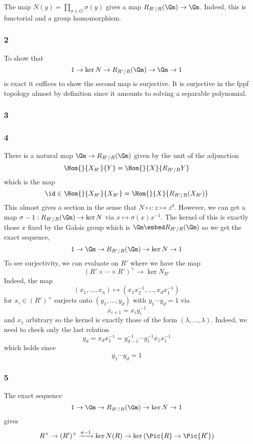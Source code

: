 \documentclass{article}
\begin{document}
The map $N(y) = \prod_{\sigma \in G} \sigma(y)$ gives a map $R_{R'/R}(\Gm) \to \Gm$. Indeed, this is functorial and a group homomorphism. 

\subsubsection{2}

To show that
\[ 1 \to \ker{N} \to R_{R'/R}(\Gm) \to \Gm \to 1 \]
is exact it suffices to show the second map is surjective. It is surjective in the fppf topology almost by definition since it amounts to solving a separable polynomial.

\subsubsection{3}

\subsubsection{4}

There is a natural map $\Gm \to R_{R'/R}(\Gm)$ given by the unit of the adjunction
\[ \Hom{}{X_{R'}}{Y} = \Hom{}{X}{R_{R'/R} Y} \]
which is the map
\[ \id \in \Hom{}{X_{R'}}{X_{R'}} = \Hom{}{X}{R_{R'/R}(X_{R'})} \]
This almost gives a section in the sense that $N \circ \iota : z \mapsto z^d$. However, we can get a map $\sigma - 1 : R_{R'/R}(\Gm) \to \ker{N}$ via $x \mapsto \sigma(x) x^{-1}$. The kernel of this is exactly those $x$ fixed by the Galois group which is $\Gm \embed R_{R'/R}(\Gm)$ so we get the exact sequence,
\[ 1 \to \Gm \to R_{R'/R}(\Gm) \to \ker{N} \to 1 \]
To see surjectivity, we can evaluate on $R'$ where we have the map
\[ (R' \times \cdots \times R')^\times \to \ker{N_{R'}} \]
Indeed, the map 
\[ (x_1, \dots, x_n) \mapsto (x_1 x_2^{-1}, \dots, x_d x_1^{-1}) \]
for $x_i \in (R')^\times$ surjects onto $(y_1, \dots, y_d)$ with $y_1 \cdots y_d = 1$ via
\[ x_{i+1} = x_i y_i^{-1} \]
and $x_1$ arbitrary so the kernel is exactly those of the form $(\lambda, \dots, \lambda)$. Indeed, we need to check only the last relation
\[ y_d = x_d x_1^{-1} = y_{d-1}^{-1} \cdots y_1^{-1} x_1 x_1^{-1} \]
which holds since
\[ y_1 \cdots y_d = 1 \]

\subsubsection{5}

The exact sequence
\[ 1 \to \Gm \to R_{R'/R}(\Gm) \to \ker{N} \to 1 \]
gives
\[ R^\times \to (R')^\times \xrightarrow{\sigma - 1} \ker{N}(R) \to \ker{(\Pic{R} \to \Pic{R'})} \]
\end{document}

